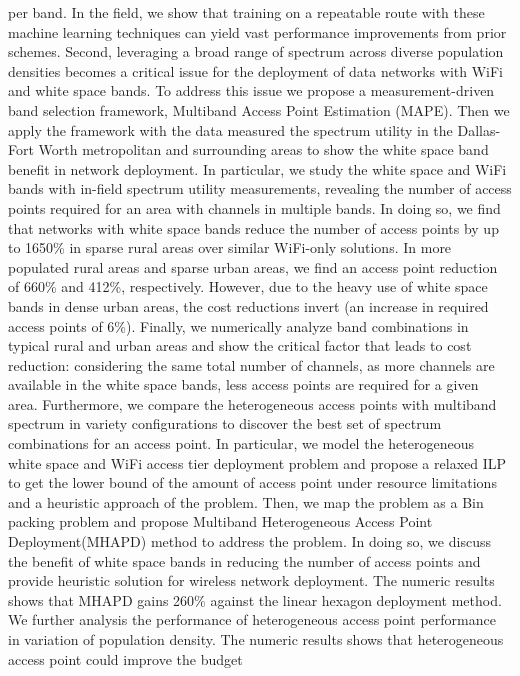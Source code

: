 per band. In the field, we show that training on a repeatable route with these 
machine learning techniques can yield vast performance improvements from prior 
schemes. 
Second, leveraging a broad range of spectrum across diverse population densities 
becomes a critical issue for the deployment of data networks with WiFi and white 
space bands. To address this issue we propose a measurement-driven band selection 
framework, Multiband Access Point Estimation (MAPE). Then we apply the framework 
with the data measured the spectrum utility in the Dallas-Fort Worth metropolitan 
and surrounding areas to show the white space band benefit in network deployment. 
In particular, we study the white space and WiFi bands with in-field spectrum 
utility measurements, revealing the number of access points required for an area 
with channels in multiple bands. In doing so, we find that networks with white space 
bands reduce the number of access points by up to 1650\% in sparse rural areas over 
similar WiFi-only solutions. In more populated rural areas and sparse urban areas, 
we find an access point reduction of 660\% and 412\%, respectively.  However, due 
to the heavy use of white space bands in dense urban areas, the cost reductions 
invert (an increase in required access points of 6\%).  Finally, we numerically 
analyze band combinations in typical rural and urban areas and show the critical 
factor that leads to cost reduction: considering the same total number of channels, 
as more channels are available in the white space bands, less access points are 
required for a given area.
Furthermore, we compare the heterogeneous access points with multiband spectrum
in variety configurations to discover the best set of spectrum combinations 
for an access point. In particular, we model the heterogeneous white space and 
WiFi access tier deployment problem and propose a relaxed ILP to get the lower 
bound of the amount of access point under resource limitations and a heuristic 
approach of the problem. Then, we map the problem as a Bin packing problem and 
propose Multiband Heterogeneous Access Point Deployment(MHAPD) method to address
the problem. In doing so, we discuss the benefit of white space bands 
in reducing the number of access points and provide heuristic solution for 
wireless network deployment. The numeric results shows that MHAPD gains 260\% 
against the linear hexagon deployment method.  We further analysis the performance 
of heterogeneous access point performance in variation of population density. 
The numeric results shows that heterogeneous access point could improve the budget 
